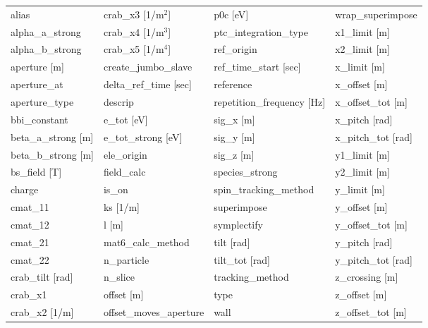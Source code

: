  \begin{tabular}{llll} \toprule
alias                            & crab_x3 [1/m$^2$]                & p0c [eV]                         & wrap_superimpose                 \\
alpha_a_strong                   & crab_x4 [1/m$^3$]                & ptc_integration_type             & x1_limit [m]                     \\
alpha_b_strong                   & crab_x5 [1/m$^4$]                & ref_origin                       & x2_limit [m]                     \\
aperture [m]                     & create_jumbo_slave               & ref_time_start [sec]             & x_limit [m]                      \\
aperture_at                      & delta_ref_time [sec]             & reference                        & x_offset [m]                     \\
aperture_type                    & descrip                          & repetition_frequency [Hz]        & x_offset_tot [m]                 \\
bbi_constant                     & e_tot [eV]                       & sig_x [m]                        & x_pitch [rad]                    \\
beta_a_strong [m]                & e_tot_strong [eV]                & sig_y [m]                        & x_pitch_tot [rad]                \\
beta_b_strong [m]                & ele_origin                       & sig_z [m]                        & y1_limit [m]                     \\
bs_field [T]                     & field_calc                       & species_strong                   & y2_limit [m]                     \\
charge                           & is_on                            & spin_tracking_method             & y_limit [m]                      \\
cmat_11                          & ks [1/m]                         & superimpose                      & y_offset [m]                     \\
cmat_12                          & l [m]                            & symplectify                      & y_offset_tot [m]                 \\
cmat_21                          & mat6_calc_method                 & tilt [rad]                       & y_pitch [rad]                    \\
cmat_22                          & n_particle                       & tilt_tot [rad]                   & y_pitch_tot [rad]                \\
crab_tilt [rad]                  & n_slice                          & tracking_method                  & z_crossing [m]                   \\
crab_x1                          & offset [m]                       & type                             & z_offset [m]                     \\
crab_x2 [1/m]                    & offset_moves_aperture            & wall                             & z_offset_tot [m]                 \\
 \bottomrule
 \end{tabular}
